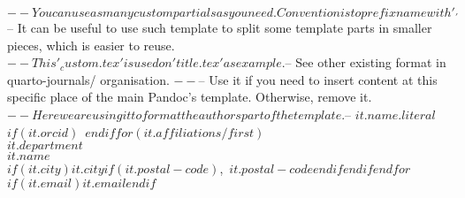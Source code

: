$-- You can use as many custom partials as you need. Convention is to prefix name with '_'
$-- It can be useful to use such template to split some template parts in smaller pieces, which is easier to reuse.
$-- This '_custom.tex' is used on 'title.tex' as example.
$-- See other existing format in quarto-journals/ organisation.
$-- %
$-- Use it if you need to insert content at this specific place of the main Pandoc's template. Otherwise, remove it.
$-- Here we are using it to format the authors part of the template.
$-- %
\textbf{$it.name.literal$}$if(it.orcid)$~$endif$$for(it.affiliations/first)$\\$it.department$\\$it.name$\\$if(it.city)$$it.city$$if(it.postal-code)$,\ $it.postal-code$$endif$$endif$$endfor$\\$if(it.email)$\href{mailto:$it.email$}{$it.email$}$endif$
